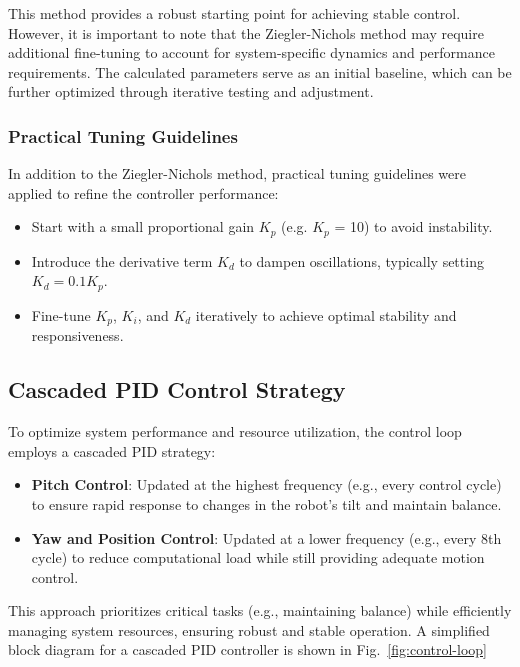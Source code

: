 This method provides a robust starting point for achieving stable control. However, it is important to note that the Ziegler-Nichols method may require additional fine-tuning to account for system-specific dynamics and performance requirements. The calculated parameters serve as an initial baseline, which can be further optimized through iterative testing and adjustment.


\subsubsection{Practical Tuning Guidelines}
In addition to the Ziegler-Nichols method, practical tuning guidelines were applied to refine the controller performance:

\begin{itemize}
	\item Start with a small proportional gain $K_p$ (e.g. $K_p$ = 10) to avoid instability.
	\item Introduce the derivative term $K_d$ to dampen oscillations, typically setting $K_d = 0 . 1K_p$.
	\item  Fine-tune $K_p$, $K_i$, and $K_d$ iteratively to achieve optimal stability and responsiveness.
\end{itemize}


\subsection{Cascaded PID Control Strategy}
To optimize system performance and resource utilization, the control loop employs a cascaded PID strategy:
\begin{itemize}
	\item \textbf{Pitch Control}: Updated at the highest frequency (e.g., every control cycle) to ensure rapid response to changes in the robot's tilt and maintain balance.
	\item \textbf{Yaw and Position Control}: Updated at a lower frequency (e.g., every 8th cycle) to reduce computational load while still providing adequate motion control.
\end{itemize}

This approach prioritizes critical tasks (e.g., maintaining balance) while efficiently managing system resources, ensuring robust and stable operation. A simplified block diagram for a cascaded PID controller is shown in Fig.~\ref{fig:control-loop}

